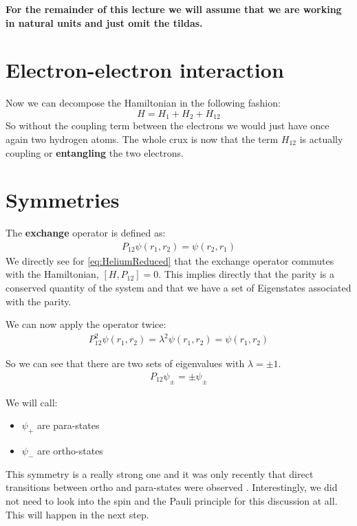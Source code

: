 \documentclass[10pt]{article}
\let\cite\citep
\providecommand\citep{\cite}
\begin{document}
\textbf{For the remainder of this lecture we will assume that we are working in natural units and just omit the tildas.}



\section{Electron-electron interaction}

Now we can decompose the Hamiltonian in the following fashion:
\begin{equation}
H = H_1 + H_2 + H_{12}
\end{equation}
So without the coupling term between the electrons we would just have once again two hydrogen atoms. The whole crux is now that the term $H_{12}$ is actually coupling or \textbf{entangling} the two electrons.



\section{Symmetries}

The \textbf{exchange} operator is defined as:
\begin{align}
P_{12}\psi(r_1,r_2) = \psi(r_2, r_1)
\end{align}
We directly see for \eqref{eq:HeliumReduced} that the exchange operator commutes with the Hamiltonian, $[H,P_{12}] = 0$. This implies directly that the parity is a conserved quantity of the system and that we have a set of Eigenstates associated with the parity. 

We can now apply the operator twice:
\begin{align}
P_{12}^2\psi(r_1,r_2) = \lambda^2 \psi(r_1, r_2) = \psi(r_1, r_2)
\end{align}

So we can see that there are two sets of eigenvalues with $\lambda = \pm 1$.
\begin{align}
P_{12}\psi_\pm = \pm \psi_\pm
\end{align}

We will call:
\begin{itemize}
\item $\psi_+$ are para-states
\item $\psi_-$ are ortho-states
\end{itemize}

This symmetry is a really strong one and it was only recently that direct transitions between ortho and para-states were observed \cite{Kanamori_2017}. Interestingly, we did not need to look into the spin and the Pauli principle for this discussion at all. This will happen in the next step.
\end{document}
